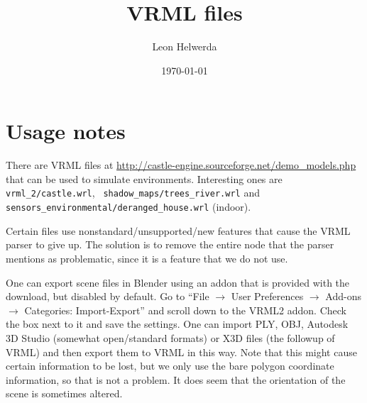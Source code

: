 \documentclass{article}
\begin{document}
\title{VRML files}
\author{Leon Helwerda}
\date{\today}

\maketitle

\section{Usage notes}
There are VRML files at 
\url{http://castle-engine.sourceforge.net/demo_models.php} that can be used to 
simulate environments. Interesting ones are {\tt vrml\_2/castle.wrl}, {\tt 
shadow\_maps/trees\_river.wrl} and {\tt 
sensors\_environmental/deranged\_house.wrl} (indoor).

Certain files use nonstandard/unsupported/new features that cause the VRML 
parser to give up. The solution is to remove the entire node that the parser 
mentions as problematic, since it is a feature that we do not use.

One can export scene files in Blender using an addon that is provided with the 
download, but disabled by default. Go to ``File $\to$ User Preferences $\to$ 
Add-ons $\to$ Categories: Import-Export'' and scroll down to the VRML2 addon.  
Check the box next to it and save the settings. One can import PLY, OBJ, 
Autodesk 3D Studio (somewhat open/standard formats) or X3D files (the followup 
of VRML) and then export them to VRML in this way. Note that this might cause 
certain information to be lost, but we only use the bare polygon coordinate 
information, so that is not a problem. It does seem that the orientation of the 
scene is sometimes altered.
\end{document}

